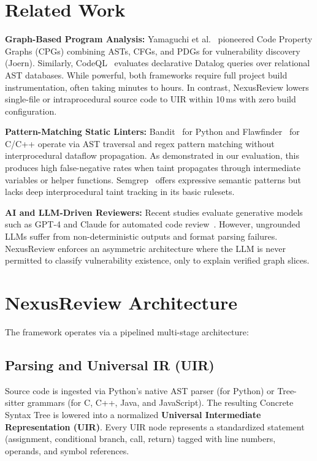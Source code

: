 \documentclass[10pt,conference]{IEEEtran}
\begin{document}
\section{Related Work}

\textbf{Graph-Based Program Analysis:} Yamaguchi et al.~\cite{joern2014} pioneered Code Property Graphs (CPGs) combining ASTs, CFGs, and PDGs for vulnerability discovery (Joern). Similarly, CodeQL~\cite{codeql2020} evaluates declarative Datalog queries over relational AST databases. While powerful, both frameworks require full project build instrumentation, often taking minutes to hours. In contrast, NexusReview lowers single-file or intraprocedural source code to UIR within 10\,ms with zero build configuration.

\textbf{Pattern-Matching Static Linters:} Bandit~\cite{bandit} for Python and Flawfinder~\cite{flawfinder} for C/C++ operate via AST traversal and regex pattern matching without interprocedural dataflow propagation. As demonstrated in our evaluation, this produces high false-negative rates when taint propagates through intermediate variables or helper functions. Semgrep~\cite{semgrep} offers expressive semantic patterns but lacks deep interprocedural taint tracking in its basic rulesets.

\textbf{AI and LLM-Driven Reviewers:} Recent studies evaluate generative models such as GPT-4 and Claude for automated code review~\cite{deputydev}. However, ungrounded LLMs suffer from non-deterministic outputs and format parsing failures. NexusReview enforces an asymmetric architecture where the LLM is never permitted to classify vulnerability existence, only to explain verified graph slices.

\section{NexusReview Architecture}

The framework operates via a pipelined multi-stage architecture:

\subsection{Parsing and Universal IR (UIR)}
Source code is ingested via Python's native AST parser (for Python) or Tree-sitter grammars (for C, C++, Java, and JavaScript). The resulting Concrete Syntax Tree is lowered into a normalized \textbf{Universal Intermediate Representation (UIR)}. Every UIR node represents a standardized statement (assignment, conditional branch, call, return) tagged with line numbers, operands, and symbol references.
\end{document}
